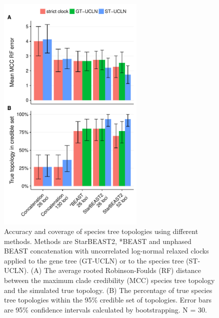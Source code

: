 \documentclass[12pt]{article}
\begin{document}
\begin{figure}[htb!]
\centering
\includegraphics[width=70mm]{topology_accuracy_unphased.pdf}
\caption
{Accuracy and coverage of species tree topologies using different methods.
Methods are StarBEAST2, *BEAST and unphased BEAST concatenation with uncorrelated
log-normal relaxed clocks applied to the gene tree (GT-UCLN) or to the species
tree (ST-UCLN). (A) The average rooted Robinson-Foulds (RF) distance between the
maximum clade credibility (MCC) species tree topology and the
simulated true topology. (B) The percentage of true species tree topologies
within the 95\% credible set of topologies. Error bars are 95\% confidence
intervals calculated by bootstrapping. N = 30.}
\label{fig:treeTopologyError}
\end{figure}

\clearpage
\end{document}
